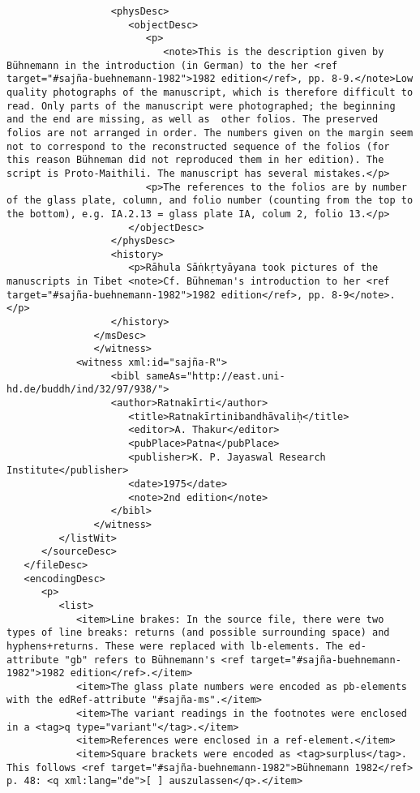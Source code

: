 \documentclass[article,12pt,a4paper]{memoir}%
\begin{document}
\begin{verbatim}
                  <physDesc>
                     <objectDesc>
                        <p>
                           <note>This is the description given by Bühnemann in the introduction (in German) to the her <ref target="#sajña-buehnemann-1982">1982 edition</ref>, pp. 8-9.</note>Low quality photographs of the manuscript, which is therefore difficult to read. Only parts of the manuscript were photographed; the beginning and the end are missing, as well as  other folios. The preserved folios are not arranged in order. The numbers given on the margin seem not to correspond to the reconstructed sequence of the folios (for this reason Bühneman did not reproduced them in her edition). The script is Proto-Maithili. The manuscript has several mistakes.</p>
                        <p>The references to the folios are by number of the glass plate, column, and folio number (counting from the top to the bottom), e.g. IA.2.13 = glass plate IA, colum 2, folio 13.</p>
                     </objectDesc>
                  </physDesc>
                  <history>
                     <p>Rāhula Sāṅkṛtyāyana took pictures of the manuscripts in Tibet <note>Cf. Bühneman's introduction to her <ref target="#sajña-buehnemann-1982">1982 edition</ref>, pp. 8-9</note>.</p>
                  </history>
               </msDesc>
	           </witness>
            <witness xml:id="sajña-R">
	              <bibl sameAs="http://east.uni-hd.de/buddh/ind/32/97/938/">
                  <author>Ratnakīrti</author>
	                 <title>Ratnakīrtinibandhāvaliḥ</title>
	                 <editor>A. Thakur</editor>
	                 <pubPlace>Patna</pubPlace>
	                 <publisher>K. P. Jayaswal Research Institute</publisher>
	                 <date>1975</date>
	                 <note>2nd edition</note>
	              </bibl>
	           </witness>
         </listWit>
      </sourceDesc>
   </fileDesc>
   <encodingDesc>
      <p>
         <list>
            <item>Line brakes: In the source file, there were two types of line breaks: returns (and possible surrounding space) and hyphens+returns. These were replaced with lb-elements. The ed-attribute "gb" refers to Bühnemann's <ref target="#sajña-buehnemann-1982">1982 edition</ref>.</item>
            <item>The glass plate numbers were encoded as pb-elements with the edRef-attribute "#sajña-ms".</item>
            <item>The variant readings in the footnotes were enclosed in a <tag>q type="variant"</tag>.</item>
            <item>References were enclosed in a ref-element.</item>
            <item>Square brackets were encoded as <tag>surplus</tag>. This follows <ref target="#sajña-buehnemann-1982">Bühnemann 1982</ref> p. 48: <q xml:lang="de">[ ] auszulassen</q>.</item>

\end{verbatim}
\end{document}
